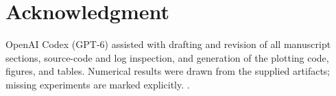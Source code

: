 \section*{Acknowledgment}
OpenAI Codex (GPT-6) assisted with drafting and revision of all manuscript
sections, source-code and log inspection, and generation of the plotting code,
figures, and tables. Numerical results were drawn from the supplied artifacts;
missing experiments are marked explicitly. .
